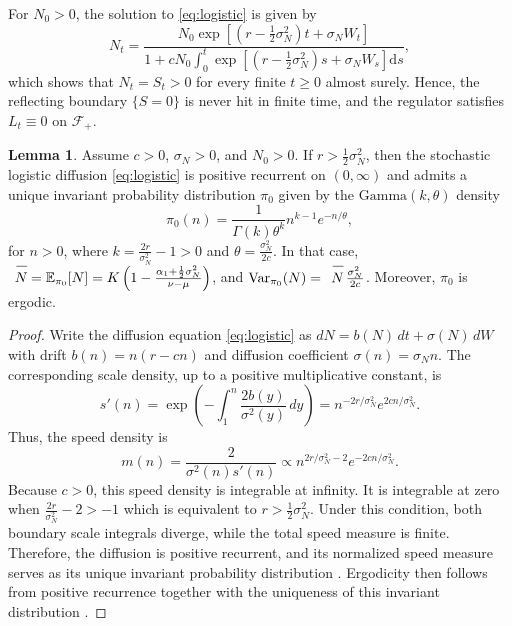 \documentclass[12pt,a4paper,reqno]{amsart}
\theoremstyle{definition}
\newtheorem{lemma}[theorem]{Lemma}
\theoremstyle{remark}
\theoremstyle{plain}
\providecommand{\dif}{\mathrm{d}}
\let\svoverline\overline
\newcommand{\uc}[1]{\mkern 5mu\svoverline{\mkern-1mu#1\mkern-0.3mu \rule{0pt}{3.5mm}}\mkern 0mu}
\let\overline\uc
\begin{document}
For $N_0>0$, the solution to \eqref{eq:logistic} is given by
$$N_t= \frac{ N_0\exp\left[\left(r-\frac12\sigma_N^2\right)t+\sigma_NW_t
\right]}{1+cN_0\displaystyle\int_0^t\exp\left[\left(r-\frac12\sigma_N^2\right)s+\sigma_NW_s \right]\dif s},$$
which shows that $N_t=S_t>0$ for every finite $t\ge0$ almost surely.
Hence, the reflecting boundary $\{S=0\}$ is never hit in finite time, and the regulator satisfies $L_t\equiv0$ on $\mathcal F_{+}$.

\begin{lemma}\label{lem:dfe}
Assume $c>0$, $\sigma_N>0$, and $N_0>0$. If $r>\frac12\sigma_N^2$, then the stochastic logistic diffusion \eqref{eq:logistic} is positive recurrent on $(0,\infty)$ and admits a unique invariant probability distribution $\pi_0$ given by the $\mathrm{Gamma}(k,\theta)$ density
$$\pi_0(n)=\frac{1}{\Gamma(k)\theta^k} n^{k-1}e^{-n/\theta},$$
for $n>0$, where $k=\frac{2r}{\sigma_N^2}-1>0$ and $\theta=\frac{\sigma_N^2}{2c}$. In that case, $\overline N=\mathbb E_{\pi_0}[N]=K\left(1-\frac{\alpha_1+\frac12\sigma_N^2}{\nu-\mu}\right)$, and $\operatorname{Var}_{\pi_0}(N)=\overline N\,\frac{\sigma_N^2}{2c}$. Moreover, $\pi_0$ is ergodic.
\end{lemma}
\begin{proof}
Write the diffusion equation \eqref{eq:logistic} as $dN = b(N)\,dt + \sigma(N)\,dW$ with drift $b(n) = n(r - c n)$ and diffusion coefficient $\sigma(n) = \sigma_N n$. The corresponding scale density, up to a positive multiplicative constant, is
$$
s'(n)
= \exp\left(-\int_1^n \frac{2b(y)}{\sigma^2(y)}\,dy\right)
= n^{-2r/\sigma_N^2} e^{2c n/\sigma_N^2}.
$$
Thus, the speed density is
$$
m(n) = \frac{2}{\sigma^2(n) s'(n)} \propto n^{2r/\sigma_N^2 - 2} e^{-2c n/\sigma_N^2}.
$$
Because $c > 0$, this speed density is integrable at infinity. It is integrable at zero when $\frac{2r}{\sigma_N^2} - 2 > -1$ which is equivalent to $r > \frac{1}{2}\sigma_N^2$. Under this condition, both boundary scale integrals diverge, while the total speed measure is finite. Therefore, the diffusion is positive recurrent, and its normalized speed measure serves as its unique invariant probability distribution \cite{karlin1981second}. Ergodicity then follows from positive recurrence together with the uniqueness of this invariant distribution
\cite{khasminskii2012stochastic}.
\end{proof}
\end{document}
